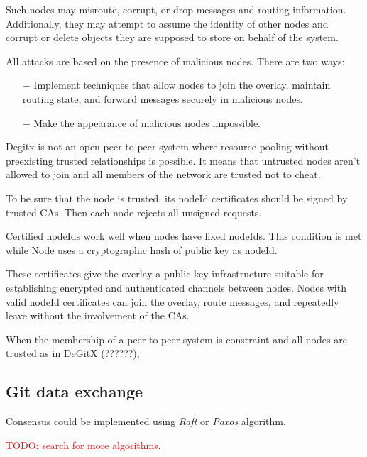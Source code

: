 \documentclass[acmlarge, screen, nonacm, 11pt]{acmart}
\newcommand{\todo}[1]{\textcolor{red}{TODO: #1}}
\begin{document}
Such nodes may misroute, corrupt, or drop messages and routing information.
Additionally, they may attempt to assume the identity of other nodes and corrupt or delete objects
they are supposed to store on behalf of the system.

All attacks are based on the presence of malicious nodes.
There are two ways:
\begin{itemize}
  \item[$-$] Implement techniques that allow nodes to join the overlay, maintain routing state, and forward messages securely in malicious nodes.
  \item[$-$] Make the appearance of malicious nodes impossible.
\end{itemize}

Degitx is not an open peer-to-peer system
where resource pooling without preexisting trusted relationships is possible.
It means that untrusted nodes aren't allowed to join
and all members of the network are trusted not to cheat.

To be sure that the node is trusted, its nodeId certificates should be signed by trusted CAs.
Then each node rejects all unsigned requests.

Certified nodeIds work well when nodes have fixed nodeIds.
This condition is met while Node uses a cryptographic hash of public key as nodeId.

These certificates give the overlay a public key infrastructure
suitable for establishing encrypted and authenticated channels between nodes.
Nodes with valid nodeId certificates can join the overlay, route messages,
and repeatedly leave without the involvement of the CAs.

When the membership of a peer-to-peer system is constraint and all nodes are trusted as in DeGitX (??????),

\subsection{Git data exchange}
\label{sec:data}
Consensus could be implemented using \emph{\href{https://raft.github.io/raft.pdf}{Raft}} or
\emph{\href{http://www.cs.yale.edu/homes/aspnes/pinewiki/Paxos.html}{Paxos}} algorithm.

\todo{search for more algorithms}.


\end{document}
